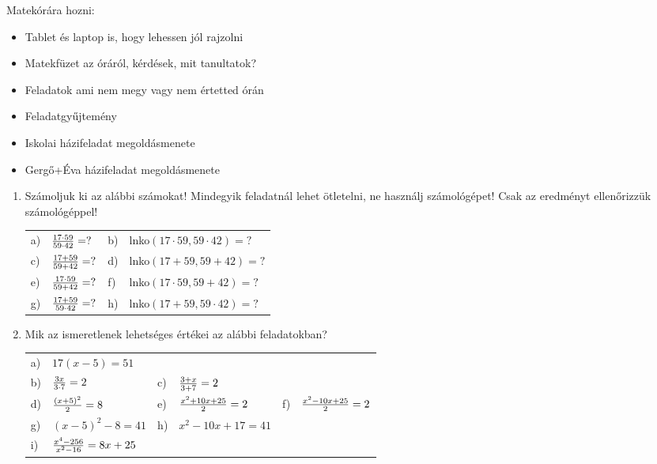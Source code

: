 \documentclass[a4paper,12pt]{article}
\begin{document}
Matekórára hozni:
\begin{itemize}
\item Tablet és laptop is, hogy lehessen jól rajzolni
\item Matekfüzet az óráról, kérdések, mit tanultatok?
\item Feladatok ami nem megy vagy nem értetted órán
\item Feladatgyűjtemény
\item Iskolai házifeladat megoldásmenete
\item Gergő+Éva házifeladat megoldásmenete
\end{itemize}

\renewcommand{\arraystretch}{1.5}

\begin{enumerate}
\item Számoljuk ki az alábbi számokat! Mindegyik feladatnál lehet ötletelni, ne használj számológépet! Csak az eredményt ellenőrizzük számológéppel!

  \begin{tabular}{@{}p{0.2cm}p{}p{0.2cm}p{}@{}}

    a) & ${17\cdot59 \over 59\cdot42} = ?$ & b) & lnko$(17\cdot59,59\cdot42) = ?$ \\

    c) & ${17+59 \over 59+42} = ?$         & d) & lnko$(17+59,59+42) = ?$ \\

    e) & ${17\cdot59 \over 59+42} = ?$     & f) & lnko$(17\cdot59,59+42) = ?$ \\

    g) & ${17+59 \over 59\cdot42} = ?$     & h) & lnko$(17+59,59\cdot42) = ?$ \\

  \end{tabular}

\item Mik az ismeretlenek lehetséges értékei az alábbi feladatokban?

  \begin{tabular}{@{}p{0.2cm}p{}p{0.2cm}p{}@{}p{0.2cm}p{}@{}}
  a) & $17(x - 5) = 51$ \\
  b) & ${3x \over 3\cdot 7} = 2$ & c) & ${3+x \over 3+7} = 2$ \\
  d) & ${(x+5)^2 \over 2} = 8$ & e) & ${x^2+10x+25\over 2} = 2$ & f) & ${x^2-10x+25\over 2} = 2$ \\
  g) & ${(x-5)^2-8} = 41$ & h) & $x^2-10x+17 = 41$ \\
  i) & ${{x^4 - 256}\over {x^2 - 16}} = 8x + 25$
  \end{tabular}

\end{enumerate}
\end{document}
